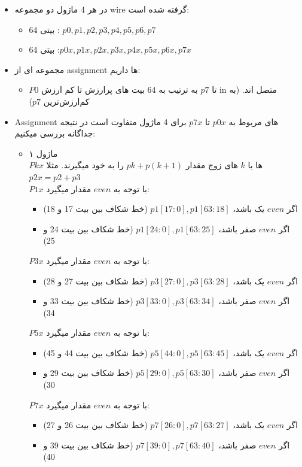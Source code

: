 \begin{itemize}
\item
در هر 4 ماژول دو مجموعه wire گرفته شده است:
\begin{itemize}
\item
64 بیتی : $p0, p1, p2, p3, p4, p5, p6, p7$
\item
64 بیتی :$ p0x,p1x,p2x,p3x,p4x,p5x,p6x,p7x$
\end{itemize}
\item
مجموعه ای از assignment ها داریم:
\begin{itemize}
\item
$P0$ تا $p7$ به ترتیب به 64 بیت های پرارزش تا کم ارزش in متصل اند. 
(به کم‌ارزش‌ترین $p7$)
\end{itemize}
\item
Assignment های مربوط به $p0x$ تا $p7x$ برای 4 ماژول متفاوت است در نتیجه جداگانه بررسی میکنیم:
\begin{itemize}
\item ماژول ۱\\
$Pkx$ ها با $k$ های زوج مقدار $pk + p(k+1)$ را به خود میگیرند. مثلا $p2x = p2 + p3$\\
$P1x$ با توجه به $even$ مقدار میگیرد: 
\begin{itemize}
\item
اگر $even$ یک باشد، { $p1[17:0], p1[63:18]$ } (خط شکاف بین بیت 17 و 18)
\item
اگر $even$ صفر باشد، { $p1[24:0], p1[63:25]$ } (خط شکاف بین بیت 24 و 25)
\end{itemize}
   $P3x$ با توجه به $even$ مقدار میگیرد: 
 \begin{itemize}
 \item
 اگر $even$ یک باشد، { $p3[27:0], p3[63:28]$ }  (خط شکاف بین بیت 27 و 28)
\item 
اگر $even$ صفر باشد، { $p3[33:0], p3[63:34]$ } (خط شکاف بین بیت 33 و 34)

 \end{itemize}
   $P5x$ با توجه به $even$ مقدار میگیرد:
   \begin{itemize}
   \item
   اگر $even$ یک باشد، { $p5[44:0], p5[63:45]$ }  (خط شکاف بین بیت 44 و 45)
   \item
اگر $even$ صفر باشد، { $p5[29:0], p5[63:30]$ } (خط شکاف بین بیت 29 و 30)
\end{itemize}    
   $P7x$ با توجه به $even$ مقدار میگیرد: 
   \begin{itemize}
   \item
   اگر $even$ یک باشد، { $p7[26:0], p7[63:27]$ }  (خط شکاف بین بیت 26 و 27)
   \item
اگر $even$ صفر باشد، { $p7[39:0], p7[63:40]$ } (خط شکاف بین بیت 39 و 40)


\end{itemize}
\end{itemize}
\end{itemize}
